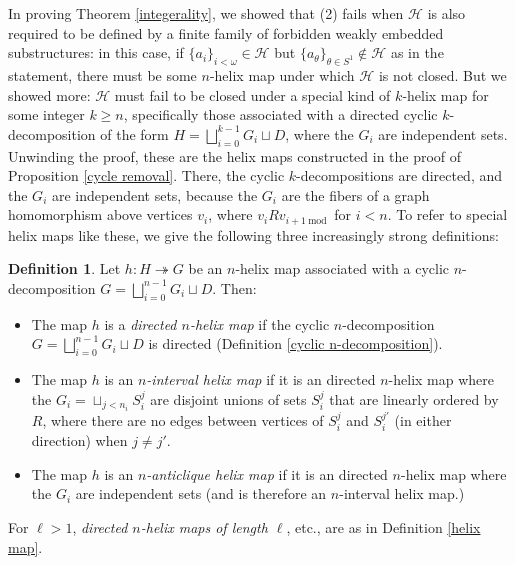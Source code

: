 \documentclass{amsart}
\theoremstyle{definition}
\newtheorem{definition}[theorem]{Definition}
\theoremstyle{remark}
\numberwithin{equation}{section}
\begin{document}
In proving Theorem \ref{integerality}, we showed that (2) fails when $\mathcal{H}$ is also required to be defined by a finite family of forbidden weakly embedded substructures: in this case, if $\{a_{i}\}_{i < \omega} \in \mathcal{H}$ but $\{a_{\theta}\}_{\theta \in S^{1}} \notin \mathcal{H}$ as in the statement, there must be some $n$-helix map under which $\mathcal{H}$ is not closed. But we showed more: $\mathcal{H}$ must fail to be closed under a special kind of $k$-helix map for some integer $k \geq n$, specifically those associated with a directed cyclic $k$-decomposition of the form $H = \bigsqcup^{k-1}_{i =0} G_{i} \sqcup D$, where the $G_{i}$ are independent sets. Unwinding the proof, these are the helix maps constructed in the proof of Proposition \ref{cycle removal}. There, the cyclic $k$-decompositions are directed, and the $G_{i}$ are independent sets, because the $G_{i}$ are the fibers of a graph homomorphism above vertices $v_{i}$, where $v_{i} R v_{i + 1 \mathrm{\:mod \:} }$ for $i < n$. To refer to special helix maps like these, we give the following three increasingly strong definitions:

\begin{definition}\label{special helices}
    Let $h: H \twoheadrightarrow G $ be an $n$-helix map associated with a cyclic $n$-decomposition $G = \bigsqcup^{n-1}_{i =0} G_{i} \sqcup D$. Then:

    \begin{itemize}
        \item The map $h$ is a \textit{directed $n$-helix map} if the cyclic $n$-decomposition $G = \bigsqcup^{n-1}_{i =0} G_{i} \sqcup D$ is directed (Definition \ref{cyclic n-decomposition}).

        \item The map $h$ is an \textit{$n$-interval helix map} if it is an directed $n$-helix map where the $G_{i}=\sqcup_{j < n_{i}} S^{j}_{i}$ are disjoint unions of sets $S^{j}_{i}$ that are linearly ordered by $R$, where there are no edges between vertices of $S^{j}_{i}$ and $S^{j'}_{i}$ (in either direction) when $j \neq j'$.


\item The map $h$ is an \textit{$n$-anticlique helix map} if it is an directed $n$-helix map where the $G_{i}$ are independent sets (and is therefore an $n$-interval helix map.)



    \end{itemize}

    
    
    For $\ell > 1$, \emph{directed $n$-helix maps of length $\ell$}, etc., are as in Definition \ref{helix map}.
\end{definition}
\end{document}
